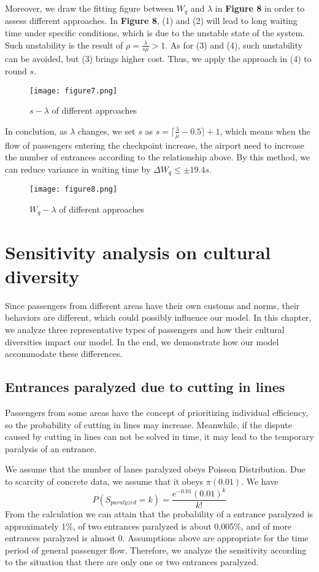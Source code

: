 \documentclass{mcmthesis}
\begin{document}
	
	Moreover, we draw the fitting figure between $W_q$ and $\lambda$ in \textbf{Figure 8} in order to assess different  approaches. In \textbf{Figure 8}, (1) and (2) will lead to long waiting time under specific conditions, which is due to the unstable state of the system. Such unstability is the result of $\rho=\frac{\lambda}{s\mu}>1$. As for (3) and (4), such unstability can be avoided, but (3) brings higher cost. Thus, we apply the approach in (4) to round $s$. 
	\begin{figure}[H]
		\small
		\centering
		\texttt{[image: figure7.png]}
		\caption{$s-\lambda$ of different approaches} \label{fig:7}
	\end{figure} 
	
	In conclution, as $\lambda$ changes, we set $s$ as $s=\lceil\frac{\lambda}{\mu}-0.5\rceil+1$, which means when the flow of passengers entering the checkpoint increase, the airport need to increase the number of entrances according to the relationship above. By this method, we can reduce variance in waiting time by $\Delta W_q \leq \pm19.4s$.
	\begin{figure}[H]
		\small
		\centering
		\texttt{[image: figure8.png]}
		\caption{$W_q-\lambda$ of different approaches} \label{fig:8}
	\end{figure}
	\section{Sensitivity analysis on cultural diversity}
	Since passengers from different areas have their own customs and norms, their behaviors are different, which could possibly influence our model. In this chapter, we analyze three representative types of passengers and how their cultural diversities impact our model. In the end, we demonstrate how our model accommodate these differences. 
	\subsection{Entrances paralyzed due to cutting in lines}
	Passengers from some areas have the concept of prioritizing individual efficiency, so the probability of cutting in lines may increase. Meanwhile, if the dispute caused by cutting in lines can not be solved in time, it may lead to the temporary paralysis of an entrance.
	
	We assume that the number of lanes paralyzed obeys Poisson Distribution. Due to scarcity of concrete data, we assume that it obeys $\pi(0.01)$. We have
	$$P(S_{paralyzed}=k)=\frac{e^{-0.01}(0.01)^k}{k!}$$
	From the calculation we can attain that the probability of a entrance paralyzed is approximately 1\%, of two entrances paralyzed is about 0.005\%, and of more entrances paralyzed is almost 0. Assumptions above are appropriate for the time period of general passenger flow. Therefore, we analyze the sensitivity according to the situation that there are only one or two entrances paralyzed.
	
\end{document}
